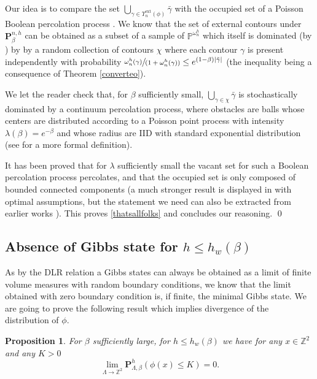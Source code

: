 \documentclass[JEP,XML,SOM,Unicode, NoFloatCountersInSection]{cedram}
\newcommand{\spfrac}[2]{\sfrac{#1}{(#2)}}
\numberwithin{equation}{section}
\theoremstyle{plain}
\newtheorem{proposition}[theorem]{Proposition}
\theoremstyle{definition}
\newcommand{\ext}{\mathrm{ext}}
\newcommand{\bP}{{\ensuremath{\mathbf P}} }
\newcommand{\bbP}{{\ensuremath{\mathbb P}} }
\newcommand{\bbZ}{{\ensuremath{\mathbb Z}} }
\newcommand{\gb}{\beta}
\newcommand{\go}{\omega}
\newcommand{\gl}{\lambda}
\newcommand{\gL}{\Lambda}
\begin{document}
Our idea is to compare the set $\bigcup_{\gamma\in \Upsilon^{\ext}_n(\phi)} \bar \gamma$ with the occupied set of a Poisson Boolean percolation process \cite{cf:ATT, cf:Hall, cf:G}.
We know that the set of external contours under $\bP^{n,h}_{\gb}$ can be obtained as a subset of a sample of $\bbP^{\go^h_n}$
which itself is dominated (\eg by \cite[Lem.\,4.4]{cf:part1}) by
by a random collection of contours $\chi$ where each contour $\gamma$ is present independently with probability
$\spfrac{\go^h_n(\gamma)}{1+\go^h_n(\gamma)}\le e^{(1-\gb) |\tilde \gamma|}$ (the inequality being a consequence of Theorem \ref{converteo}).

We let the reader check that, for $\gb$ sufficiently small, $\bigcup_{\gamma\in \chi} \bar \gamma$ is stochastically dominated by a continuum percolation process,
where obstacles are balls whose centers are distributed according to a Poisson point process with intensity $\gl(\gb)=e^{-\gb}$ and
whose radius are IID with standard exponential distribution (see \eg \cite{cf:ATT, cf:Hall, cf:G} for a more formal definition).

It has been proved that for $\gl$ sufficiently small the vacant set for such a Boolean percolation process percolates, and that the occupied set is
only composed of bounded connected components (a much stronger result is displayed in \cite[Th.\,1]{cf:ATT} with optimal assumptions,
but the statement we need can also be extracted from earlier works
\eg \cite{cf:G, cf:Hall}). This proves \eqref{thatsallfolks} and concludes our reasoning.
\qed

\subsection{Absence of Gibbs state for $h\le h_w(\gb)$ }\label{noon}

As by the DLR relation a Gibbs states can always be obtained as a limit of finite volume measures with random boundary conditions,
we know that the limit obtained with zero boundary condition is, if finite, the minimal Gibbs state.
We are going to prove the following result which implies divergence of the distribution of $\phi$.

\begin{proposition}
For $\gb$ sufficiently large, for $h\le h_w(\gb)$ we have for any $x\in \bbZ^2$ and any $K>0$
\begin{equation*}
\lim_{\gL\to \bbZ^2} \bP^{h}_{\gL,\gb}(\phi(x)\le K)=0.
\end{equation*}
\end{proposition}
\end{document}
